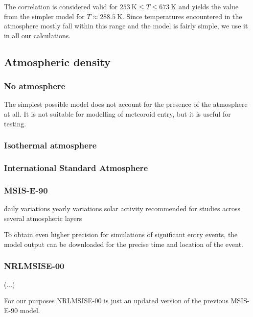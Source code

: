             The correlation is considered valid for $\SI{253}{\kelvin} \leq T \leq \SI{673}{\kelvin}$
            and yields the value from the simpler model for $T \approx \SI{288.5}{\kelvin}$.
            Since temperatures encountered in the atmosphere mostly fall within this range
            and the model is fairly simple, we use it in all our calculations.

    \subsection{Atmospheric density} \label{fdd}

        \subsubsection{No atmosphere} \label{fddn}
            The simplest possible model does not account for the presence of the atmosphere at all.
            It is not suitable for modelling of meteoroid entry, but it is useful for testing.

        \subsubsection{Isothermal atmosphere} \label{fddt}

        \subsubsection{International Standard Atmosphere} \label{fddi}

        \subsubsection{MSIS-E-90} \label{fdd9}
            daily variations
            yearly variations
            solar activity
            recommended for studies across several atmospheric layers \cite{...}

            To obtain even higher precision for simulations of significant entry events,
            the model output can be downloaded for the precise time and location of the event.

        \subsubsection{NRLMSISE-00} \label{fdd0}
            (...)

            For our purposes NRLMSISE-00 is just an updated version of the previous MSIS-E-90 model.


